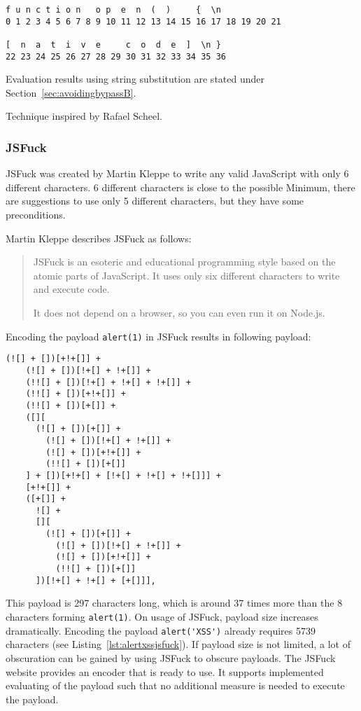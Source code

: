 \begin{lstlisting}[style=basicStyle, caption=open.toString() with indices in JavaScript, label={lst:opentostringindices}]
f u n c t i o n   o p  e  n  (  )     {  \n
0 1 2 3 4 5 6 7 8 9 10 11 12 13 14 15 16 17 18 19 20 21

[  n  a  t  i  v  e     c  o  d  e  ]  \n }
22 23 24 25 26 27 28 29 30 31 32 33 34 35 36
\end{lstlisting}

Evaluation results using string substitution are stated under Section~\ref{sec:avoidingbypassB}.

Technique inspired by Rafael Scheel. \cite{onecons/wafbypass}


\subsubsection{JSFuck}
\label{sec:jsfuck}
JSFuck was created by Martin Kleppe to write any valid JavaScript with only 6 different characters. 6 different characters is close to the possible Minimum, there are suggestions to use only 5 different characters, but they have some preconditions. \cite{mk/five, tc39/pipeline}

Martin Kleppe describes JSFuck as follows:
\begin{quote}
	JSFuck is an esoteric and educational programming style based on the atomic parts of JavaScript. It uses only six different characters to write and execute code.

	It does not depend on a browser, so you can even run it on Node.js. \cite{mk/jsfuck}
\end{quote}
Encoding the payload \verb|alert(1)| in JSFuck results in following payload:
\begin{lstlisting}[style=basicStyle, caption=alert(1) in JSFuck, label={lst:alert1jsfuck}]
  (![] + [])[+!+[]] +
    (![] + [])[!+[] + !+[]] +
    (!![] + [])[!+[] + !+[] + !+[]] +
    (!![] + [])[+!+[]] +
    (!![] + [])[+[]] +
    ([][
      (![] + [])[+[]] +
        (![] + [])[!+[] + !+[]] +
        (![] + [])[+!+[]] +
        (!![] + [])[+[]]
    ] + [])[+!+[] + [!+[] + !+[] + !+[]]] +
    [+!+[]] +
    ([+[]] +
      ![] +
      [][
        (![] + [])[+[]] +
          (![] + [])[!+[] + !+[]] +
          (![] + [])[+!+[]] +
          (!![] + [])[+[]]
      ])[!+[] + !+[] + [+[]]],
\end{lstlisting}

This payload is 297 characters long, which is around 37 times more than the 8 characters forming \verb|alert(1)|. On usage of JSFuck, payload size increases dramatically. Encoding the payload \verb|alert('XSS')| already requires 5739 characters (see Listing~\ref{lst:alertxssjsfuck}). If payload size is not limited, a lot of obscuration can be gained by using JSFuck to obscure payloads. The JSFuck website provides an encoder that is ready to use. It supports implemented evaluating of the payload such that no additional measure is needed to execute the payload. \cite{mk/jsfuck}

